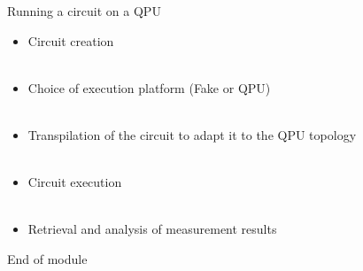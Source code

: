 \documentclass[aspectratio=169,12pt]{beamer}
\begin{document}
\begin{frame}{Running a circuit on a QPU}
  \begin{itemize}
    \item Circuit creation\\~\\
    \item Choice of execution platform (Fake or QPU)\\~\\
    \item Transpilation of the circuit to adapt it to the QPU topology\\~\\
    \item Circuit execution\\~\\
    \item Retrieval and analysis of measurement results
  \end{itemize}
\end{frame}

\begin{frame}{End of module}
\end{frame}
\end{document}
